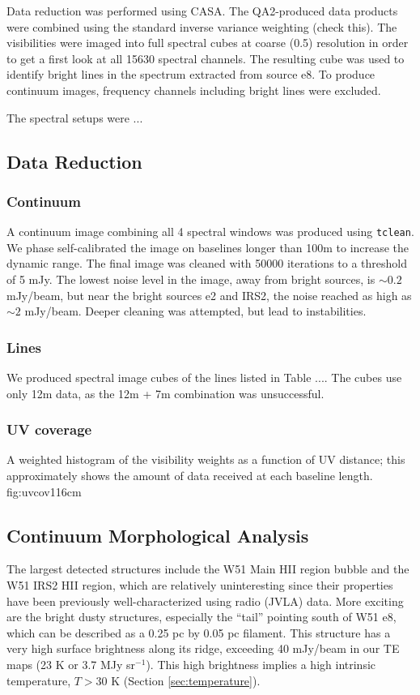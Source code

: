 \documentclass{aa}
\begin{document}
Data reduction was performed using CASA.  The QA2-produced data products were
combined using the standard inverse variance weighting (check this).
The visibilities were imaged into full spectral cubes at coarse (0.5\arcsec)
resolution in order to get a first look at all 15630 spectral channels.  The
resulting cube was used to identify bright lines in the spectrum extracted
from source e8.  To produce continuum images, frequency channels including
bright lines were excluded.

The spectral setups were ...

\subsection{Data Reduction}
\subsubsection{Continuum}
A continuum image combining all 4 spectral windows was produced using
\texttt{tclean}.  We phase self-calibrated the image on baselines longer than
100m to increase the dynamic range.  The final image was cleaned with 50000
iterations to a threshold of 5 mJy.  The lowest noise level in the image, away
from bright sources, is $\sim0.2$ mJy/beam, but near the bright sources e2 and
IRS2, the noise reached as high as $\sim2$ mJy/beam.  Deeper cleaning was
attempted, but lead to instabilities.


\subsubsection{Lines}
We produced spectral image cubes of the lines listed in Table ....
The cubes use only 12m data, as the 12m + 7m combination was unsuccessful.


\subsubsection{UV coverage}
{A weighted histogram of the visibility weights as a function of UV distance;
this approximately shows the amount of data received at each baseline length.}
{fig:uvcov}{1}{16cm}

\subsection{Continuum Morphological Analysis}
\label{sec:morphology}
The largest detected structures include the W51 Main HII region bubble and the
W51 IRS2 HII region, which are relatively uninteresting since their properties
have been previously well-characterized using radio (JVLA) data.  More exciting
are the bright dusty structures, especially the ``tail'' pointing south of W51
e8, which can be described as a 0.25 pc by 0.05 pc filament. This structure has
a very high surface brightness along its ridge, exceeding 40 mJy/beam in our TE
maps (23 K or 3.7 MJy sr$^{-1}$).  This high brightness implies a high
intrinsic temperature, $T>30$ K (Section \ref{sec:temperature}).
\end{document}
